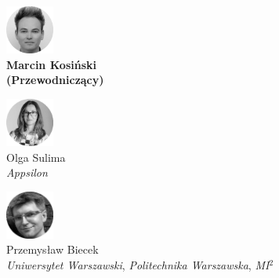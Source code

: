 \begin{minipage}[t]{0.33\textwidth}
	\center     
    \includegraphics[width=60px]{img/people/czarno_biale/marcin-crop.png}   \\
    \textbf{Marcin Kosiński \\ (Przewodniczący)}
\end{minipage}
\begin{minipage}[t]{0.33\textwidth}
	\center 
    \includegraphics[width=60px]{img/people/czarno_biale/olga-crop.png}    \\
    Olga Sulima \\
	\textit{Appsilon}  
\end{minipage}
\begin{minipage}[t]{0.33\textwidth}
	\center     
    \includegraphics[width=60px]{img/people/czarno_biale/przemek-crop.png}   \\
    Przemysław Biecek \\
	\textit{Uniwersytet Warszawski}, \textit{Politechnika Warszawska}, \textit{MI$^{2}$}    
\end{minipage}

